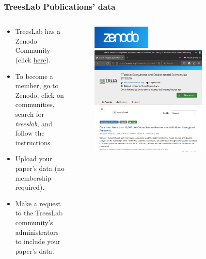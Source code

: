 \documentclass[aspectratio=169]{beamer}
\begin{document}
\begin{frame}
    \frametitle{TreesLab Publications' data}
    \begin{columns}
        \begin{column}{0.5\textwidth}
            \begin{itemize}
                \item TreesLab has a Zenodo Community (click 
            \href{https://zenodo.org/communities/treeslab}{here}).
                \item To become a member, go to Zenodo, click on communities, 
                    search for \emph{treeslab}, and follow the instructions.
                \item Upload your paper's data (no membership required). 
                \item Make a request to the TreesLab community's administrators 
                    to include your paper's data.
            \end{itemize} 
        \end{column}
        \begin{column}{0.5\textwidth}
            \begin{figure}
                \centering
                \includegraphics[width=0.4\textwidth]{logos/zenodo.png}
                \includegraphics[width=0.8\textwidth]{img/zenodo_treeslab.png}
            \end{figure}
        \end{column}
    \end{columns}
\end{frame}
\end{document}
